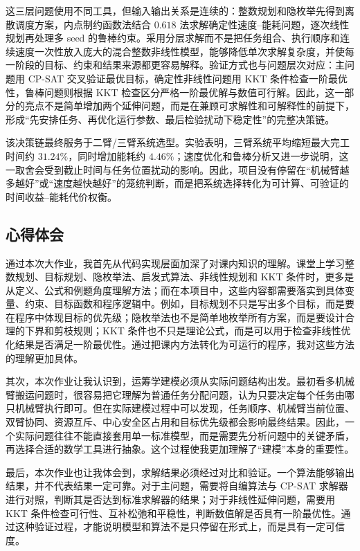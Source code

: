 \begin{enumerate}
这三层问题使用不同工具，但输入输出关系是连续的：整数规划和隐枚举先得到离散调度方案，内点制约函数法结合 $0.618$ 法求解确定性速度--能耗问题，逐次线性规划再处理多 seed 的鲁棒约束。采用分层求解而不是把任务组合、执行顺序和连续速度一次性放入庞大的混合整数非线性模型，能够降低单次求解复杂度，并使每一阶段的目标、约束和结果来源都更容易解释。验证方式也与问题层次对应：主问题用 CP-SAT 交叉验证最优目标，确定性非线性问题用 KKT 条件检查一阶最优性，鲁棒问题则根据 KKT 检查区分严格一阶最优解与数值可行解。因此，这一部分的亮点不是简单增加两个延伸问题，而是在兼顾可求解性和可解释性的前提下，形成“先安排任务、再优化运行参数、最后检验扰动下稳定性”的完整决策链。

该决策链最终服务于二臂/三臂系统选型。实验表明，三臂系统平均缩短最大完工时间约 $31.24\%$，同时增加能耗约 $4.46\%$；速度优化和鲁棒分析又进一步说明，这一取舍会受到截止时间与任务位置扰动的影响。因此，项目没有停留在“机械臂越多越好”或“速度越快越好”的笼统判断，而是把系统选择转化为可计算、可验证的时间收益--能耗代价权衡。
 
\end{enumerate}

\subsection{心得体会}

通过本次大作业，我首先从代码实现层面加深了对课内知识的理解。课堂上学习整数规划、目标规划、隐枚举法、启发式算法、非线性规划和 KKT 条件时，更多是从定义、公式和例题角度理解方法；而在本项目中，这些内容都需要落实到具体变量、约束、目标函数和程序逻辑中。例如，目标规划不只是写出多个目标，而是要在程序中体现目标的优先级；隐枚举法也不是简单地枚举所有方案，而是要设计合理的下界和剪枝规则；KKT 条件也不只是理论公式，而是可以用于检查非线性优化结果是否满足一阶最优性。通过把课内方法转化为可运行的程序，我对这些方法的理解更加具体。

其次，本次作业让我认识到，运筹学建模必须从实际问题结构出发。最初看多机械臂搬运问题时，很容易把它理解为普通任务分配问题，认为只要决定每个任务由哪只机械臂执行即可。但在实际建模过程中可以发现，任务顺序、机械臂当前位置、双臂协同、资源互斥、中心安全区占用和目标优先级都会影响最终结果。因此，一个实际问题往往不能直接套用单一标准模型，而是需要先分析问题中的关键矛盾，再选择合适的数学工具进行抽象。这个过程使我更加理解了“建模”本身的重要性。

最后，本次作业也让我体会到，求解结果必须经过对比和验证。一个算法能够输出结果，并不代表结果一定可靠。对于主问题，需要将自编算法与 CP-SAT 求解器进行对照，判断其是否达到标准求解器的结果；对于非线性延伸问题，需要用 KKT 条件检查可行性、互补松弛和平稳性，判断数值解是否具有一阶最优性。通过这种验证过程，才能说明模型和算法不是只停留在形式上，而是具有一定可信度。

